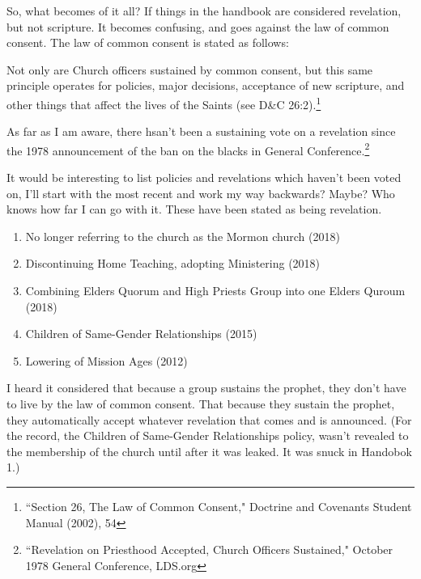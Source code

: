 So, what becomes of it all? If things in the handbook are considered revelation, but
not scripture. It becomes confusing, and goes against the law of common consent. The
law of common consent is stated as follows:

\begin{displayquote}
Not only are Church officers sustained by common consent, but this same principle 
operates for policies, major decisions, acceptance of new scripture, and other things 
that affect the lives of the Saints (see D\&C 26:2).\footnote{``Section 26, The Law 
of Common Consent," Doctrine and Covenants Student Manual (2002), 54}
\end{displayquote}

As far as I am aware, there hsan't been a sustaining vote on a revelation since the
1978 announcement of the ban on the blacks in General Conference.\footnote{
``Revelation on Priesthood Accepted, Church Officers Sustained," October 1978 General
Conference, LDS.org
}

It would be interesting to list policies and revelations which haven't been voted on,
I'll start with the most recent and work my way backwards? Maybe? Who knows how far I
can go with it. These have been stated as being revelation.

\begin{enumerate}
\item No longer referring to the church as the Mormon church (2018)
\item Discontinuing Home Teaching, adopting Ministering (2018)
\item Combining Elders Quorum and High Priests Group into one Elders Quroum (2018)
\item Children of Same-Gender Relationships (2015)
\item Lowering of Mission Ages (2012)
\end{enumerate}

I heard it considered that because a group sustains the prophet, they don't have to
live by the law of common consent. That because they sustain the prophet, they
automatically accept whatever revelation that comes and is announced. (For the
  record, the Children of Same-Gender Relationships policy, wasn't revealed to
  the membership of the church until after it was leaked. It was snuck in Handobok
  1.)